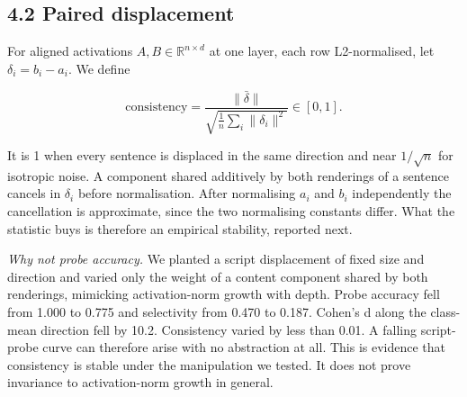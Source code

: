 \hypertarget{paired-displacement}{%
\subsection{4.2 Paired displacement}\label{paired-displacement}}

For aligned activations \(A, B \in \mathbb{R}^{n \times d}\) at one
layer, each row L2-normalised, let \(\delta_i = b_i - a_i\). We define

\[\text{consistency} = \frac{\lVert \bar{\delta}
\rVert}{\sqrt{\frac{1}{n}\sum_i \lVert \delta_i \rVert^2}} \in [0, 1].\]

It is 1 when every sentence is displaced in the same direction and near
\(1/\sqrt{n}\) for isotropic noise. A component shared additively by
both renderings of a sentence cancels in \(\delta_i\) before
normalisation. After normalising \(a_i\) and \(b_i\) independently the
cancellation is approximate, since the two normalising constants differ.
What the statistic buys is therefore an empirical stability, reported
next.

\emph{Why not probe accuracy.} We planted a script displacement of fixed
size and direction and varied only the weight of a content component
shared by both renderings, mimicking activation-norm growth with depth.
Probe accuracy fell from 1.000 to 0.775 and selectivity from 0.470 to
0.187. Cohen's d along the class-mean direction fell by 10.2.
Consistency varied by less than 0.01. A falling script-probe curve can
therefore arise with no abstraction at all. This is evidence that
consistency is stable under the manipulation we tested. It does not
prove invariance to activation-norm growth in general.


